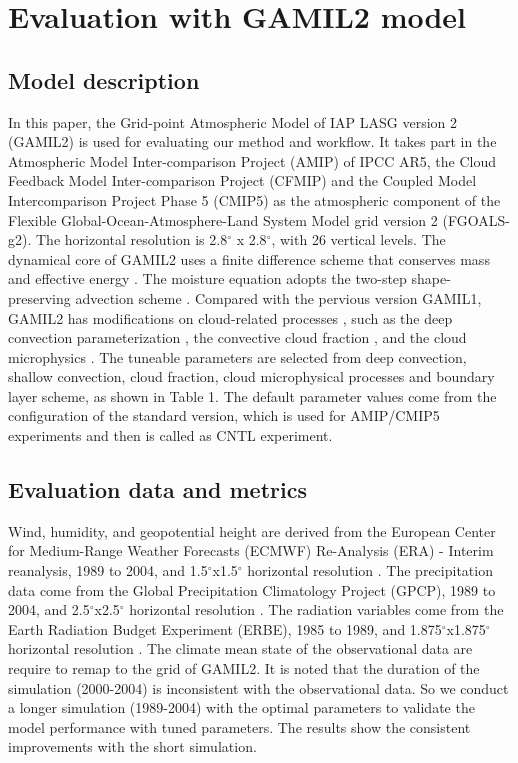 \documentclass[gmd, manuscript]{copernicus}
\begin{document}
\section{Evaluation with GAMIL2 model} 
\subsection{Model description} 
In this paper, the Grid-point Atmospheric Model of IAP LASG version 2 (GAMIL2) is used for evaluating our method and workflow. It takes part in the Atmospheric Model Inter-comparison Project (AMIP) of IPCC AR5, the Cloud Feedback Model Inter-comparison Project (CFMIP) and the Coupled Model Intercomparison Project Phase 5 (CMIP5) as the atmospheric component of the Flexible Global-Ocean-Atmosphere-Land System Model grid version 2 (FGOALS-g2). The horizontal resolution is 2.8$^\circ$ x 2.8$^\circ$, with 26 vertical levels. The dynamical core of GAMIL2 uses a finite difference scheme that conserves mass and effective energy \citep{wang2004design}. The moisture equation adopts the two-step shape-preserving advection scheme \citep{rucong1994two}. Compared with the pervious version GAMIL1, GAMIL2 has modifications on cloud-related processes \citep{li2013evaluation}, such as the deep convection parameterization \citep{zhang2005effects}, the convective cloud fraction \citep{xu1991evaluation}, and the cloud microphysics \citep{morrison2008new}. The tuneable parameters are selected  from deep convection, shallow convection, cloud fraction, cloud microphysical processes and boundary layer scheme, as shown in Table 1. The default parameter values come from the configuration of the standard version, which is used for AMIP/CMIP5 experiments and then is called as CNTL experiment.



\subsection{Evaluation data and metrics}
Wind, humidity, and geopotential height are derived from the European Center for Medium-Range Weather Forecasts (ECMWF) Re-Analysis (ERA) - Interim reanalysis, 1989 to 2004, and 1.5$^\circ$x1.5$^\circ$ horizontal resolution \citep{simmons2007era}. The precipitation data come from the Global Precipitation Climatology Project (GPCP), 1989 to 2004, and 2.5$^\circ$x2.5$^\circ$ horizontal resolution \citep{adler2003version}. The radiation variables come from the Earth Radiation Budget Experiment (ERBE), 1985 to 1989,  and 1.875$^\circ$x1.875$^\circ$ horizontal resolution \citep{barkstrom1984earth}. The climate mean state of the observational data are require to  remap to the grid of GAMIL2. It is noted that the duration of the simulation (2000-2004)  is inconsistent with the observational data. So we conduct a longer simulation (1989-2004) with the optimal parameters to validate the model performance with tuned parameters. The results show the consistent improvements with the short simulation.
\end{document}

